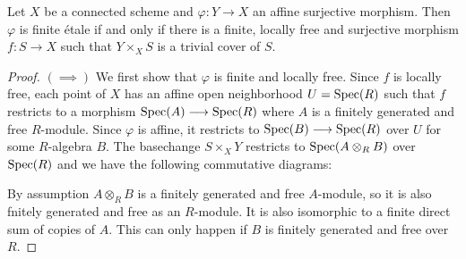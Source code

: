 \begin{theorem}
	\label{locallyTrivial}
	Let $X$ be a connected scheme and $\varphi : Y \to X$ an affine surjective morphism. Then $\varphi$ is finite \'etale if and only if there is a finite, locally free and surjective morphism $f: S \to X$ such that $Y \times_X S$ is a trivial cover of $S$.
\end{theorem}
\begin{proof}
	$(\implies)$
	We first show that $\varphi$ is finite and locally free. Since $f$ is locally free, each point of $X$ has an affine open neighborhood $U = \operatorname{Spec}(R)$ such that $f$ restricts to a morphism $\operatorname{Spec}(A) \longrightarrow \operatorname{Spec}(R)$ where $A$ is a finitely generated and free $R$-module. Since $\varphi$ is affine, it restricts to $\operatorname{Spec}(B) \longrightarrow \operatorname{Spec}(R)$ over $U$ for some $R$-algebra $B$. The basechange $S \times_X Y$ restricts to $\operatorname{Spec}(A \otimes_R B)$ over $\operatorname{Spec}(R)$ and we have the following commutative diagrams:
	\begin{figure}
		\centering
		\begin{minipage}{0.4\textwidth}
		\end{minipage}
		\begin{minipage}{0.4\textwidth}
		\end{minipage}
	\end{figure}

	By assumption $A \otimes_R B$ is a finitely generated and free $A$-module, so it is also fnitely generated and free as an $R$-module. It is also isomorphic to a finite direct sum of copies of $A$. This can only happen if $B$ is finitely generated and free over $R$. \par


\end{proof}
